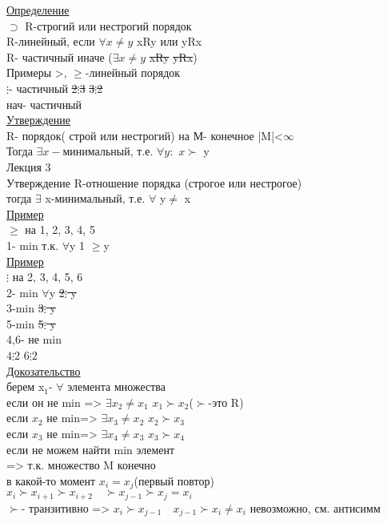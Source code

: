 \documentclass{article}
\begin{document}
\underline{Определение}\\
$\supset$ R-строгий или нестрогий порядок\\
R-линейный, если $\forall x\neq y$ xRy или yRx\\
R- частичный иначе ($\exists x\neq y$ \sout{xRy} \sout{yRx})\\
Примеры >, $\geq$-линейный порядок\\
$\vdots$- частичный \sout{2$\vdots$3} \sout{3$\vdots$2}\\
нач- частичный\\
\underline{Утверждение}\\
R- порядок( строй или нестрогий) на М- конечное |M|<$\infty$\\
Тогда $\exists x-$минимальный, т.е. $\forall y:$ $x\succ$ y\\
Лекция 3\\
Утверждение R-отношение порядка (строгое или нестрогое)\\
тогда $\exists$ x-минимальный, т.е. $\forall$ y$\neq$ x\\
\underline{Пример}\\
$\geq$ на {1, 2, 3, 4, 5}\\
1- min т.к. $\forall$y 1 $\geq$y\\
\underline{Пример}\\
$\vdots$ на {2, 3, 4, 5, 6}\\
2- min $\forall$y \sout{2$\vdots$ y}\\
3-min \sout{3$\vdots$ y}\\
5-min \sout{5$\vdots$ y}\\
4,6- не min\\
$4\vdots 2$ $6 \vdots 2$\\
\underline{Докозательство}\\
берем x$_1$- $\forall$ элемента множества\\
если он не min => $\exists x_2 \neq x_1$ $x_1 \succ x_2$($\succ$-это R)\\
если $x_2$ не min=> $\exists x_3 \neq x_2$ $x_2 \succ x_3$\\
если $x_3$ не min=> $\exists x_4 \neq x_3$ $x_3 \succ x_4$\\
если не можем найти min элемент\\
=> т.к. множество M конечно\\
в какой-то момент $x_i = x_j$(первый повтор)\\
$x_i \succ x_{i+1}\succ x_{i+2}\quad \succ x_{j-1}\succ x_j =x_i$\\
$\succ$- транзитивно => $x_i \succ x_{j-1} \quad x_{j-1} \succ x_i \neq x_i$ невозможно, см. антисимм\\
\end{document}
